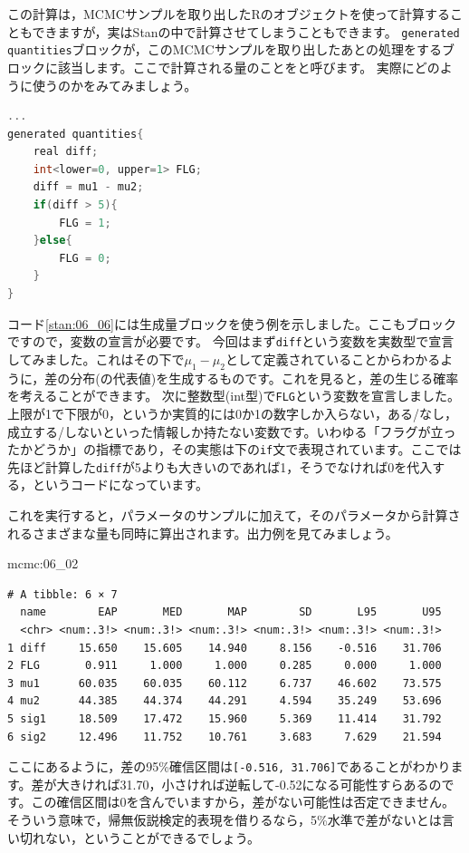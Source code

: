 \documentclass{ltjsbook}
\begin{document}
この計算は，MCMCサンプルを取り出したRのオブジェクトを使って計算することもできますが，実はStanの中で計算させてしまうこともできます。
\texttt{generated quantities}ブロックが，このMCMCサンプルを取り出したあとの処理をするブロックに該当します。ここで計算される量のことをと呼びます。
実際にどのように使うのかをみてみましょう。

\begin{lstlisting}[language=C++,label={stan:06_06},caption={生成量ブロックの利用}]
    ...
generated quantities{
    real diff;
    int<lower=0, upper=1> FLG;
    diff = mu1 - mu2;
    if(diff > 5){
        FLG = 1;
    }else{
        FLG = 0;
    }
}

\end{lstlisting}

コード\ref{stan:06_06}には生成量ブロックを使う例を示しました。ここもブロックですので，変数の宣言が必要です。
今回はまず\verb|diff|という変数を実数型で宣言してみました。これはその下で$\mu_1-\mu_2$として定義されていることからわかるように，差の分布(の代表値)を生成するものです。これを見ると，差の生じる確率を考えることができます。
次に整数型(int型)で\verb|FLG|という変数を宣言しました。上限が1で下限が0，というか実質的には0か1の数字しか入らない，ある/なし，成立する/しないといった情報しか持たない変数です。いわゆる「フラグが立ったかどうか」の指標であり，その実態は下の\texttt{if}文で表現されています。ここでは先ほど計算した\verb|diff|が5よりも大きいのであれば1，そうでなければ0を代入する，というコードになっています。

これを実行すると，パラメータのサンプルに加えて，そのパラメータから計算されるさまざまな量も同時に算出されます。出力例を見てみましょう。
\begin{MCMCout}{}{mcmc:06_02}
	\begin{verbatim}
# A tibble: 6 × 7
  name        EAP       MED       MAP        SD       L95       U95
  <chr> <num:.3!> <num:.3!> <num:.3!> <num:.3!> <num:.3!> <num:.3!>
1 diff     15.650    15.605    14.940     8.156    -0.516    31.706
2 FLG       0.911     1.000     1.000     0.285     0.000     1.000
3 mu1      60.035    60.035    60.112     6.737    46.602    73.575
4 mu2      44.385    44.374    44.291     4.594    35.249    53.696
5 sig1     18.509    17.472    15.960     5.369    11.414    31.792
6 sig2     12.496    11.752    10.761     3.683     7.629    21.594
\end{verbatim}
\end{MCMCout}

ここにあるように，差の95\%確信区間は\verb|[-0.516, 31.706]|であることがわかります。差が大きければ31.70，小さければ逆転して-0.52になる可能性すらあるのです。この確信区間は0を含んでいますから，差がない可能性は否定できません。そういう意味で，帰無仮説検定的表現を借りるなら，5\%水準で差がないとは言い切れない，ということができるでしょう。
\end{document}
